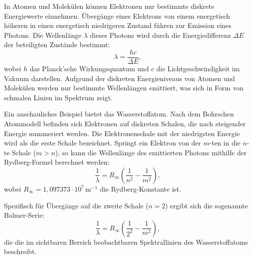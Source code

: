 In Atomen und Molekülen können Elektronen nur bestimmte diskrete Energiewerte einnehmen. Übergänge eines Elektrons von einem energetisch höheren in einen energetisch niedrigeren Zustand führen zur Emission eines Photons. Die Wellenlänge $\lambda$ dieses Photons wird durch die Energiedifferenz $\Delta E$ der beteiligten Zustände bestimmt:  
\begin{equation}
\lambda = \frac{hc}{\Delta E},
\end{equation}  
wobei $h$ das Planck'sche Wirkungsquantum und $c$ die Lichtgeschwindigkeit im Vakuum darstellen. Aufgrund der diskreten Energieniveaus von Atomen und Molekülen werden nur bestimmte Wellenlängen emittiert, was sich in Form von schmalen Linien im Spektrum zeigt.

Ein anschauliches Beispiel bietet das Wasserstoffatom. Nach dem Bohrschen Atommodell befinden sich Elektronen auf diskreten Schalen, die nach steigender Energie nummeriert werden. Die Elektronenschale mit der niedrigsten Energie wird als die erste Schale bezeichnet. Springt ein Elektron von der $m$-ten in die $n$-te Schale ($m>n$), so kann die Wellenlänge des emittierten Photons mithilfe der Rydberg-Formel berechnet werden:  
\begin{equation}
\frac{1}{\lambda} = R_\infty \left(\frac{1}{n^2} - \frac{1}{m^2}\right),
\label{eq:konst}
\end{equation}  
wobei $R_\infty = 1,097373 \cdot 10^7 \,\mathrm{m^{-1}}$ die Rydberg-Konstante ist.

Spezifisch für Übergänge auf die zweite Schale ($n=2$) ergibt sich die sogenannte Balmer-Serie:  
\begin{equation}
\frac{1}{\lambda} = R_\infty \left(\frac{1}{2^2} - \frac{1}{m^2}\right),
\end{equation}  
die die im sichtbaren Bereich beobachtbaren Spektrallinien des Wasserstoffatoms beschreibt.
